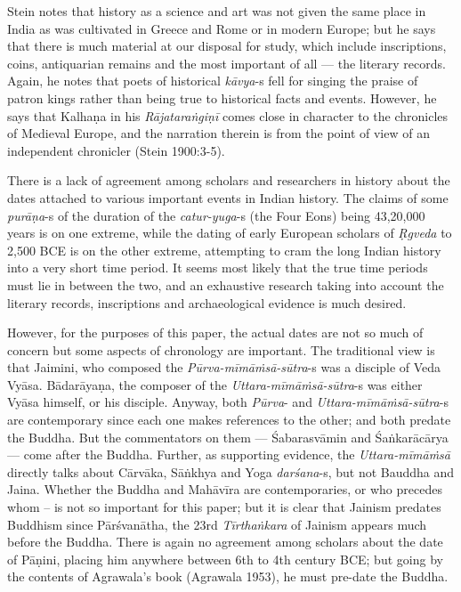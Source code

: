 Stein notes that history as a science and art was not given the same place in India as was cultivated in Greece and Rome or in modern Europe; but he says that there is much material at our disposal for study, which include inscriptions, coins, antiquarian remains and the most important of all — the literary records. Again, he notes that poets of historical \textit{kāvya}-s fell for singing the praise of patron kings rather than being true to historical facts and events. However, he says that Kalhaṇa in his \textit{Rājataraṅgiṇī} comes close in character to the chronicles of Medieval Europe, and the narration therein is from the point of view of an independent chronicler (Stein 1900:3-5).

There is a lack of agreement among scholars and researchers in history about the dates attached to various important events in Indian history. The claims of some \textit{purāṇa}-s of the duration of the \textit{catur-yuga}-s (the Four Eons) being 43,20,000 years is on one extreme, while the dating of early European scholars of \textit{Ṛgveda} to 2,500 BCE is on the other extreme, attempting to cram the long Indian history into a very short time period. It seems most likely that the true time periods must lie in between the two, and an exhaustive research taking into account the literary records, inscriptions and archaeological evidence is much desired.

However, for the purposes of this paper, the actual dates are not so much of concern but some aspects of chronology are important. The traditional view is that Jaimini, who composed the \textit{Pūrva-mīmāṁsā-sūtra}-s was a disciple of Veda Vyāsa. Bādarāyaṇa, the composer of the \textit{Uttara-mīmāṁsā-sūtra}-s was either Vyāsa himself, or his disciple. Anyway, both \textit{Pūrva}- and \textit{Uttara-mīmāṁsā-sūtra}-s are contemporary since each one makes references to the other; and both predate the Buddha. But the commentators on them — Śabarasvāmin and Śaṅkarācārya — come after the Buddha. Further, as supporting evidence, the \textit{Uttara-mīmāṁsā} directly talks about Cārvāka, Sāṅkhya and Yoga \textit{darśana}-s, but not Bauddha and Jaina. Whether the Buddha and Mahāvīra are contemporaries, or who precedes whom – is not so important for this paper; but it is clear that Jainism predates Buddhism since Pārśvanātha, the 23rd \textit{Tīrthaṅkara} of Jainism appears much before the Buddha. There is again no agreement among scholars about the date of Pāṇini, placing him anywhere between 6th to 4th century BCE; but going by the contents of Agrawala’s book (Agrawala 1953), he must pre-date the Buddha.


